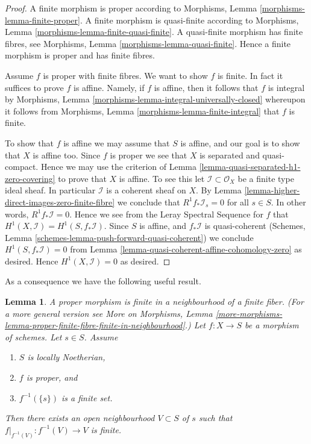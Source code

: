 \documentclass{stacks-project}
\newenvironment{slogan}{\comment}{\endcomment}
\theoremstyle{plain}
\newtheorem{lemma}[subsection]{Lemma}
\theoremstyle{definition}
\theoremstyle{remark}
\numberwithin{equation}{subsection}
\begin{document}
\begin{proof}
A finite morphism is proper according to
Morphisms, Lemma \ref{morphisms-lemma-finite-proper}.
A finite morphism is quasi-finite according to
Morphisms, Lemma \ref{morphisms-lemma-finite-quasi-finite}.
A quasi-finite morphism has finite fibres, see
Morphisms, Lemma \ref{morphisms-lemma-quasi-finite}.
Hence a finite morphism is proper and has finite fibres.

\medskip\noindent
Assume $f$ is proper with finite fibres.
We want to show $f$ is finite.
In fact it suffices to prove $f$ is affine.
Namely, if $f$ is affine, then it follows that
$f$ is integral by
Morphisms, Lemma \ref{morphisms-lemma-integral-universally-closed}
whereupon it follows from
Morphisms, Lemma \ref{morphisms-lemma-finite-integral}
that $f$ is finite.

\medskip\noindent
To show that $f$ is affine we may assume that $S$ is affine, and our
goal is to show that $X$ is affine too.
Since $f$ is proper we see that $X$ is separated and quasi-compact.
Hence we may use the criterion of
Lemma \ref{lemma-quasi-separated-h1-zero-covering} to prove that $X$
is affine. To see this let $\mathcal{I} \subset \mathcal{O}_X$
be a finite type ideal sheaf. In particular $\mathcal{I}$ is
a coherent sheaf on $X$. By
Lemma \ref{lemma-higher-direct-images-zero-finite-fibre} we conclude that
$R^1f_*\mathcal{I}_s = 0$ for all $s \in S$.
In other words, $R^1f_*\mathcal{I} = 0$. Hence we see from
the Leray Spectral Sequence for $f$ that
$H^1(X , \mathcal{I}) = H^1(S, f_*\mathcal{I})$.
Since $S$ is affine, and $f_*\mathcal{I}$ is quasi-coherent
(Schemes, Lemma \ref{schemes-lemma-push-forward-quasi-coherent})
we conclude $H^1(S, f_*\mathcal{I}) = 0$
from Lemma \ref{lemma-quasi-coherent-affine-cohomology-zero}
as desired. Hence $H^1(X, \mathcal{I}) = 0$ as desired.
\end{proof}

\noindent
As a consequence we have the following useful result.

\begin{lemma}
\label{lemma-proper-finite-fibre-finite-in-neighbourhood}
\begin{slogan}
A proper morphism is finite in a neighbourhood of a finite fiber.
\end{slogan}
(For a more general version see
More on Morphisms,
Lemma \ref{more-morphisms-lemma-proper-finite-fibre-finite-in-neighbourhood}.)
Let $f : X \to S$ be a morphism of schemes.
Let $s \in S$.
Assume
\begin{enumerate}
\item $S$ is locally Noetherian,
\item $f$ is proper, and
\item $f^{-1}(\{s\})$ is a finite set.
\end{enumerate}
Then there exists an open neighbourhood $V \subset S$ of $s$
such that $f|_{f^{-1}(V)} : f^{-1}(V) \to V$ is finite.
\end{lemma}
\end{document}
